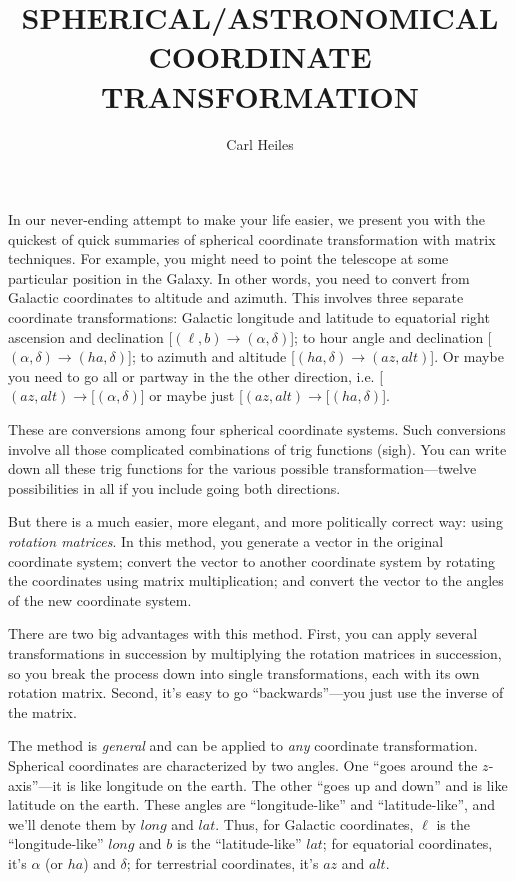 \documentclass[]{article}
\begin{document}
\title{SPHERICAL/ASTRONOMICAL COORDINATE TRANSFORMATION}
\author{Carl Heiles}

\maketitle

    In our never-ending attempt to make your life easier, we present
you with the quickest of quick summaries of spherical coordinate
transformation with matrix techniques.  For example, you might need to
point the telescope at some particular position in the Galaxy.  In other
words, you need to convert from Galactic coordinates to altitude and
azimuth.  This involves three separate coordinate transformations:
Galactic longitude and latitude to equatorial right ascension and
declination [$(\ell, b) \rightarrow (\alpha, \delta)$]; to hour angle
and declination [$(\alpha, \delta) \rightarrow (ha, \delta)$]; to
azimuth and altitude [$(ha, \delta) \rightarrow (az, alt)$].  Or maybe
you need to go all or partway in the the other direction, i.e.  [$(az,
alt) \rightarrow [(\alpha, \delta)$] or maybe just [$(az, alt)
\rightarrow [(ha, \delta)$]. 

    These are conversions among four spherical coordinate systems. 
Such conversions involve all those complicated combinations of trig
functions (sigh).  You can write down all these trig functions for the
various possible transformation---twelve possibilities in all if you
include going both directions. 

    But there is a much easier, more elegant, and more politically
correct way: using {\it rotation matrices}.   In this method, you
generate a vector in the original coordinate system; convert the vector
to another coordinate system by rotating the coordinates using matrix
multiplication; and convert the vector to the angles of the new
coordinate system.  

    There are two big advantages with this method.  First, you can
apply several transformations in succession by multiplying the rotation
matrices in succession, so you break the process down into single
transformations, each with its own rotation matrix.  Second, it's easy
to go ``backwards''---you just use the inverse of the matrix. 

    The method is {\it general} and can be applied to {\it any}
coordinate transformation.  Spherical coordinates are characterized by
two angles.  One ``goes around the $z$-axis''---it is like longitude on
the earth.  The other ``goes up and down'' and is like latitude on the
earth.  These angles are ``longitude-like'' and ``latitude-like'', and
we'll denote them by $long$ and $lat$.  Thus, for Galactic coordinates,
$\ell$ is the ``longitude-like'' $long$ and $b$ is the ``latitude-like''
$lat$; for equatorial coordinates, it's $\alpha$ (or $ha$) and $\delta$;
for terrestrial coordinates, it's $az$ and $alt$. 
\end{document}
